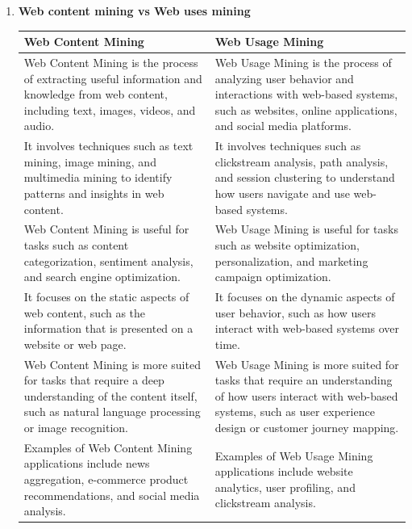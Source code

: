 \documentclass[12pt]{article}
\begin{document}
\begin{enumerate}
\begin{enumerate}
\begin{longtable}{|p{6cm}|p{6cm}|}
            \hline
            \label{tab:csf-kpi}
            \end{longtable}
        \item {\bfseries Web content mining vs Web uses mining}
        \begin{longtable}{|p{6cm}|p{6cm}|}
            \hline
            \textbf{Web Content Mining} & \textbf{Web Usage Mining} \\
            \hline
            Web Content Mining is the process of extracting useful information and knowledge from web content, including text, images, videos, and audio. & Web Usage Mining is the process of analyzing user behavior and interactions with web-based systems, such as websites, online applications, and social media platforms. \\
            \hline
            It involves techniques such as text mining, image mining, and multimedia mining to identify patterns and insights in web content. & It involves techniques such as clickstream analysis, path analysis, and session clustering to understand how users navigate and use web-based systems. \\
            \hline
            Web Content Mining is useful for tasks such as content categorization, sentiment analysis, and search engine optimization. & Web Usage Mining is useful for tasks such as website optimization, personalization, and marketing campaign optimization. \\
            \hline
            It focuses on the static aspects of web content, such as the information that is presented on a website or web page. & It focuses on the dynamic aspects of user behavior, such as how users interact with web-based systems over time. \\
            \hline
            Web Content Mining is more suited for tasks that require a deep understanding of the content itself, such as natural language processing or image recognition. & Web Usage Mining is more suited for tasks that require an understanding of how users interact with web-based systems, such as user experience design or customer journey mapping. \\
            \hline
            Examples of Web Content Mining applications include news aggregation, e-commerce product recommendations, and social media analysis. & Examples of Web Usage Mining applications include website analytics, user profiling, and clickstream analysis. \\
            \hline
            \end{longtable}

\end{enumerate}
\end{enumerate}
\end{document}
